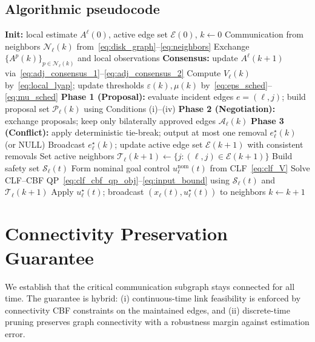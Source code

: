 \documentclass[conference]{IEEEconf}
\theoremstyle{plain}
\begin{document}
\subsection{Algorithmic pseudocode}
\begin{algorithm}[t]
\caption{Concurrent Distributed Pruning + CLF--CBF Control (executed by robot $\ell$)}
\label{alg:overall}
\begin{algorithmic}[1]
\STATE \textbf{Init:} local estimate $A^\ell(0)$, active edge set $\mathcal{E}(0)$, $k\gets 0$
    \STATE Communication from neighbors $\mathcal{N}_\ell(k)$ from~\eqref{eq:disk_graph}--\eqref{eq:neighbors}
    \STATE Exchange $\{A^p(k)\}_{p\in\mathcal{N}_\ell(k)}$ and local observations
    \STATE \textbf{Consensus:} update $A^\ell(k{+}1)$ via~\eqref{eq:adj_consensus_1}--\eqref{eq:adj_consensus_2}
    \STATE Compute $V_\ell(k)$ by~\eqref{eq:local_lyap}; update thresholds $\varepsilon(k),\mu(k)$ by~\eqref{eq:eps_sched}--\eqref{eq:mu_sched}
    \STATE \textbf{Phase 1 (Proposal):} evaluate incident edges $e=(\ell,j)$; build proposal set $\mathcal{P}_\ell(k)$ using Conditions (i)--(iv)
    \STATE \textbf{Phase 2 (Negotiation):} exchange proposals; keep only bilaterally approved edges $\mathcal{A}_\ell(k)$
    \STATE \textbf{Phase 3 (Conflict):} apply deterministic tie-break; output at most one removal $e^\star_\ell(k)$ (or NULL)
    \STATE Broadcast $e^\star_\ell(k)$; update active edge set $\mathcal{E}(k{+}1)$ with consistent removals
    \STATE Set active neighbors $\mathcal{T}_\ell(k{+}1)\gets\{j:(\ell,j)\in\mathcal{E}(k{+}1)\}$
        \STATE Build safety set $\mathcal{S}_\ell(t)$
        \STATE Form nominal goal control $u_\ell^{\mathrm{nom}}(t)$ from CLF~\eqref{eq:clf_V}
        \STATE Solve CLF--CBF QP~\eqref{eq:clf_cbf_qp_obj}--\eqref{eq:input_bound} using $\mathcal{S}_\ell(t)$ and $\mathcal{T}_\ell(k{+}1)$
        \STATE Apply $u_\ell^\star(t)$; broadcast $(x_\ell(t),u_\ell^\star(t))$ to neighbors
    \ENDFOR
    \STATE $k\gets k{+}1$
\ENDWHILE
\end{algorithmic}
\end{algorithm}

\section{Connectivity Preservation Guarantee}
\label{sec:conn_guarantee}

We establish that the critical communication subgraph stays connected for all time.
The guarantee is hybrid: (i) continuous-time link feasibility is enforced by connectivity CBF constraints on the maintained edges, and
(ii) discrete-time pruning preserves graph connectivity with a robustness margin against estimation error.
\end{document}

